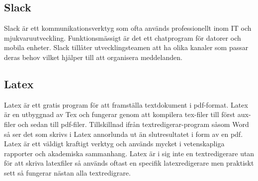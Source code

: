 \subsection*{Slack}
Slack är ett kommunikationsverktyg som ofta används professionellt inom IT och mjukvaruutveckling. Funktionsmässigt är det ett chatprogram för datorer och mobila enheter. Slack tillåter utvecklingsteamen att ha olika kanaler som passar deras behov vilket hjälper till att organisera meddelanden\cite{Slack}.

\subsection*{Latex}
Latex är ett gratis program för att framställa textdokument i pdf-format. Latex är en utbyggnad av Tex och fungerar genom att kompilera tex-filer till först aux-filer och sedan till pdf-filer. Tillskillnad ifrån textredigerar-program såsom Word så ser det som skrivs i Latex annorlunda ut än slutresultatet i form av en pdf. Latex är ett väldigt kraftigt verktyg och används mycket i vetenskapliga rapporter och akademiska sammanhang\cite{ctan}. Latex är i sig inte en textredigerare utan för att skriva latexfiler så används oftast en specifik latexredigerare men praktiskt sett så fungerar nästan alla textredigrare.